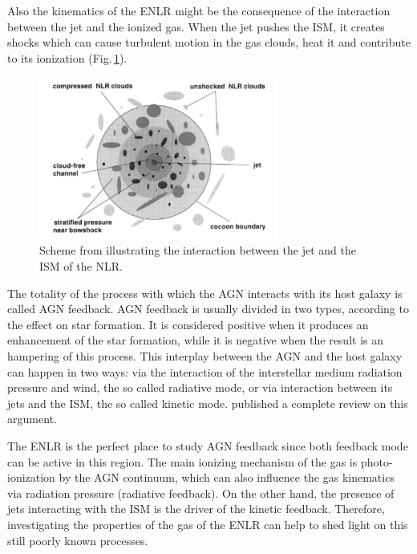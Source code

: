\documentclass[../thesis.tex]{subfiles}
\begin{document}
Also the kinematics of the ENLR might be the consequence of the interaction between the jet and the ionized gas.
When the jet pushes the ISM, it creates shocks which can
cause turbulent motion in the gas clouds, heat it and contribute to its ionization \citep[e.g.][]{Steffen97,Morse98,Rodriguez05,Contini12,Congiu17} (Fig.\,\ref{fig:interaction}).

\begin{figure}
\centering
\includegraphics[width=0.7\textwidth]{images/Jet-ism.pdf} 
\caption[]{Scheme from \citet{Steffen97} illustrating the interaction between the jet and the ISM of the NLR.}
\label{fig:interaction}
\end{figure}

The totality of the process with which the AGN interacts with its host galaxy is called AGN feedback.
AGN feedback is usually divided in two types, according to the effect on star formation.
It is considered positive when it produces an enhancement of the star formation, while it is negative when the result is an hampering of this process.
This interplay between the AGN and the host galaxy can happen in two ways: via the interaction of the interstellar medium radiation pressure and wind, the so called radiative mode, or via interaction between its jets and the ISM, the so called kinetic mode.
\citet{Fabian12} published a complete review on this argument.

The ENLR is the perfect place to study AGN feedback since both feedback mode can be active in this region.
The main ionizing mechanism of the gas is photo-ionization by the AGN continuum, which can also influence the gas kinematics via radiation pressure (radiative feedback).
On the other hand, the presence of jets interacting with the ISM is the driver of the kinetic feedback.
Therefore, investigating the properties of the gas of the ENLR can help to shed light on this still poorly known processes.



























\biblio
\end{document}
